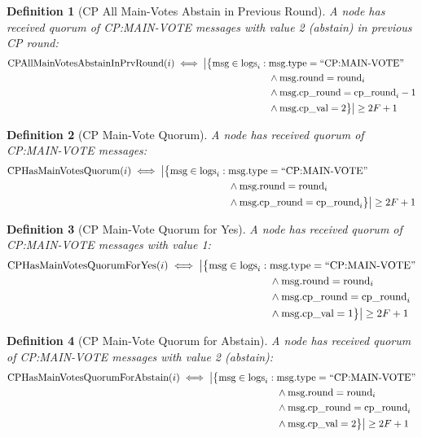 \documentclass[11pt,a4paper,twoside]{article}
\newtheorem{definition}{Definition}[section]
\begin{document}
\begin{definition}[CP All Main-Votes Abstain in Previous Round]
A node has received quorum of CP:MAIN-VOTE messages with value 2 (abstain) in previous CP round:
\begin{align}
\text{CPAllMainVotesAbstainInPrvRound}(i) \iff \big|\big\{\text{msg} \in \text{logs}_i : {} & \text{msg.type} = \text{``CP:MAIN-VOTE''} \notag \\
& \land \text{msg.round} = \text{round}_i \notag \\
& \land \text{msg.cp\_round} = \text{cp\_round}_i - 1 \notag \\
& \land \text{msg.cp\_val} = 2\big\}\big| \geq 2F + 1
\end{align}
\end{definition}

\begin{definition}[CP Main-Vote Quorum]
A node has received quorum of CP:MAIN-VOTE messages:
\begin{align}
\text{CPHasMainVotesQuorum}(i) \iff \big|\big\{\text{msg} \in \text{logs}_i : {} & \text{msg.type} = \text{``CP:MAIN-VOTE''} \notag \\
& \land \text{msg.round} = \text{round}_i \notag \\
& \land \text{msg.cp\_round} = \text{cp\_round}_i\big\}\big| \geq 2F + 1
\end{align}
\end{definition}

\begin{definition}[CP Main-Vote Quorum for Yes]
A node has received quorum of CP:MAIN-VOTE messages with value 1:
\begin{align}
\text{CPHasMainVotesQuorumForYes}(i) \iff \big|\big\{\text{msg} \in \text{logs}_i : {} & \text{msg.type} = \text{``CP:MAIN-VOTE''} \notag \\
& \land \text{msg.round} = \text{round}_i \notag \\
& \land \text{msg.cp\_round} = \text{cp\_round}_i \notag \\
& \land \text{msg.cp\_val} = 1\big\}\big| \geq 2F + 1
\end{align}
\end{definition}

\begin{definition}[CP Main-Vote Quorum for Abstain]
A node has received quorum of CP:MAIN-VOTE messages with value 2 (abstain):
\begin{align}
\text{CPHasMainVotesQuorumForAbstain}(i) \iff \big|\big\{\text{msg} \in \text{logs}_i : {} & \text{msg.type} = \text{``CP:MAIN-VOTE''} \notag \\
& \land \text{msg.round} = \text{round}_i \notag \\
& \land \text{msg.cp\_round} = \text{cp\_round}_i \notag \\
& \land \text{msg.cp\_val} = 2\big\}\big| \geq 2F + 1
\end{align}
\end{definition}
\end{document}
